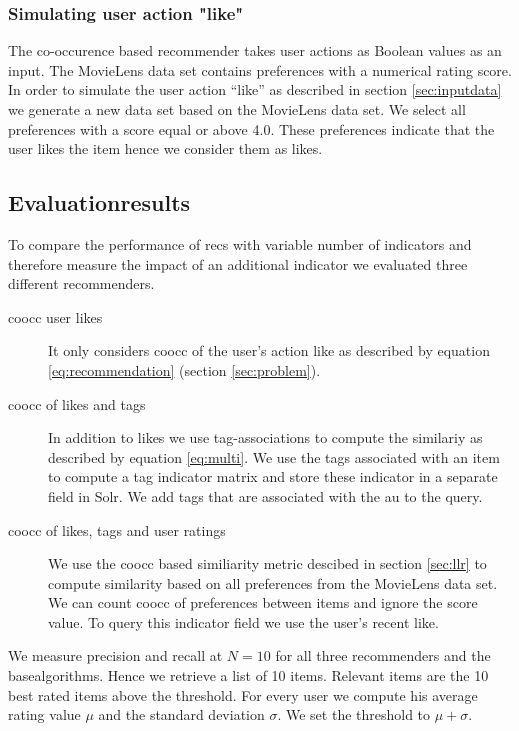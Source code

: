 \subsubsection{Simulating user action "like"}

The co-occurence based recommender takes user actions as Boolean values as an input. The MovieLens data set contains preferences with a numerical rating score. 
In order to simulate the user action ``like'' as described in section \ref{sec:inputdata} we generate a new data set based on the MovieLens data set. We select all preferences with a score equal or above 4.0. These \glspl{preference} indicate that the user likes the item hence we consider them as likes.

\subsection{Evaluationresults}
\label{sec:results}
To compare the performance of \glspl{rec} with variable number of \glspl{indicator} and therefore measure the impact of an additional indicator we evaluated three different recommenders. 

\begin{description}
\item[\Gls{coocc} user likes] It only considers \gls{coocc} of the user's action \gls{like} as described by equation \ref{eq:recommendation} (section \ref{sec:problem}).
\item[\Gls{coocc} of likes and tags] In addition to likes we use tag-associations to compute the similariy as described by equation \ref{eq:multi}. We use the tags associated with an item to compute a tag \gls{indicator} matrix and store these indicator in a separate field in Solr. We add tags that are associated with the \gls{au} to the query.
\item[\Gls{coocc} of likes, tags and user ratings] We use the \gls{coocc} based similiarity metric descibed in section \ref{sec:llr} to compute similarity based on all preferences from the MovieLens data set. We can count \gls{coocc} of preferences between items and ignore the score value. To query this \gls{indicator} field we use the user's recent like.
\end{description}

We measure precision and recall at $N=10$ for all three recommenders and the basealgorithms. Hence we retrieve a list of 10 items. Relevant items are the 10 best rated items above the threshold. For every user we compute his average rating value $\mu$ and the standard deviation $\sigma$. We set the threshold to $\mu + \sigma$.

